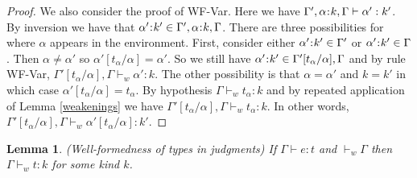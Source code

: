 \documentclass[11pt]{article}
\newtheorem{lemma}[theorem]{Lemma}
\newcommand{\al}{\alpha}
\newcommand{\bind}{\hspace{0.05em}{:}\hspace{0.05em}} %
\begin{document}
\begin{proof}
We also consider the proof of {\sc WF-Var}. Here we have $\Gamma', \al\bind k,\Gamma \vdash \al' : k'$. By inversion we have that $\al'\bind k' \in\Gamma', \al\bind k,\Gamma$. There are three possibilities for where $\al$ appears in the environment. First, consider either $\al'\bind k' \in\Gamma'$ or $\al'\bind k' \in\Gamma$. Then $\al\neq\al'$ so $\al'[t_\al/\al] = \al'$. So we still have $\al'\bind k' \in \Gamma'[t_\al/\al],\Gamma$ and by rule {\sc WF-Var}, $\Gamma'[t_\al/\al],\Gamma \vdash_w \al' : k$. The other possibility is that $\al = \al'$ and $k = k'$ in which case $\al'[t_\al/\al] = t_\al$. By hypothesis $\Gamma \vdash_w t_\al : k$ and by repeated application of Lemma \ref{weakenings} we have $\Gamma'[t_\al/\al], \Gamma \vdash_w t_\al : k$. In other words, $\Gamma'[t_\al/\al], \Gamma \vdash_w \al'[t_\al/\al] : k'$.
\end{proof}

\begin{lemma}\label{types-wf}
(Well-formedness of types in judgments) 
If $\Gamma \vdash e: t$ and $\vdash_{w} \Gamma$ then $\Gamma \vdash_w t : k$ for some kind $k$.
\end{lemma}
\end{document}

